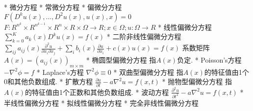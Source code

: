 * 微分方程
	* 常微分方程	
	* 偏微分方程
		\Define
			$F(D^k u(x), ... , D^2 u(x), u(x), x) = 0$
			$F: R^{n^k} × R^{n^{k-1}} × R^n × R × \Omega \to R; x \in \Omega; u: \Omega \to R$
		* 线性偏微分方程
			\Define
				$\sum_{k=0}^K a_k(x) D^k u(x) = f(x)$
			* 二阶非线性偏微分方程
				\Define
					$\sum_{ij} a_{ij}(x) \frac{∂^2 u}{∂ x_i ∂ x_j} + \sum_i b_i(x) \frac{∂ u}{∂ x_i} + c(x) u(x) = f(x)$
					系数矩阵$A(x) = (a_{ij}(x))_{m×m}$
				* 椭圆型偏微分方程
					\Define
						指$A(x)$负定.
					\Include
						* Poisson's方程
							\Define
								$ -\nabla^2 \phi = f $
							* Laplace's方程
								$ \nabla^2 \phi ≡ 0 $
				* 双曲型偏微分方程
					\Define
						指$A(x)$的特征值由1个0和其他负数组成.
					\Include
						* 扩散方程
							\Define
								$\frac{∂u}{∂t} - a \nabla^2 u = f(x,t)$
				* 抛物型偏微分方程
					\Define
						指$A(x)$的特征值由1个正数和其他负数组成.
					\Include
						* 波动方程
							\Define
								$\frac{∂^2 u}{∂t^2} - a \nabla^2 u = f(x,t)$
		* 半线性偏微分方程
		* 拟线性偏微分方程
		* 完全非线性偏微分方程





